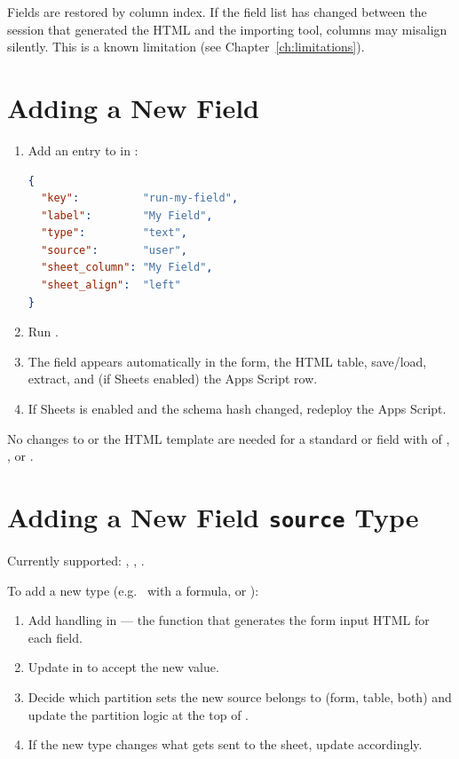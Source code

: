 Fields are restored by column index. If the field list has changed between
the session that generated the HTML and the importing tool, columns may
misalign silently. This is a known limitation (see
Chapter~\ref{ch:limitations}).

\chapter{Adding a New Field}

\begin{enumerate}
    \item Add an entry to  in :
\begin{lstlisting}[language=JSON]
{
  "key":          "run-my-field",
  "label":        "My Field",
  "type":         "text",
  "source":       "user",
  "sheet_column": "My Field",
  "sheet_align":  "left"
}
\end{lstlisting}
    \item Run .
    \item The field appears automatically in the form, the HTML table,
          save/load, extract, and (if Sheets enabled) the Apps Script row.
    \item If Sheets is enabled and the schema hash changed, redeploy the
          Apps Script.
\end{enumerate}

No changes to  or the HTML template are needed for a standard
 or  field with  of ,
, or .

\chapter{Adding a New Field \texttt{source} Type}

Currently supported: , , .

To add a new type (e.g.\  with a formula, or ):

\begin{enumerate}
    \item Add handling in  --- the
          function that generates the form input HTML for each field.
    \item Update  in  to accept
          the new value.
    \item Decide which partition sets the new source belongs to (form, table,
          both) and update the partition logic at the top of
          .
    \item If the new type changes what gets sent to the sheet, update
           accordingly.
\end{enumerate}

